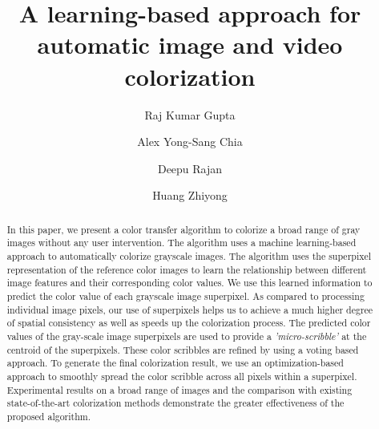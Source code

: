 \documentclass[twocolumn]{svjour3}          %
\begin{document}

\title{A learning-based approach for automatic image and video colorization}
\subtitle{}

\author{Raj Kumar Gupta \and Alex Yong-Sang Chia \and Deepu Rajan \and Huang Zhiyong}
\date{ }%

\maketitle


\begin{abstract}
In this paper, we present a color transfer algorithm to colorize a broad range of gray images without any user intervention. The algorithm uses a machine learning-based approach to automatically colorize grayscale images. The algorithm uses the superpixel representation of the reference color images to learn the relationship between different image features and their corresponding color values. We use this learned information to predict the color value of each grayscale image superpixel. As compared to processing individual image pixels, our use of superpixels helps us to achieve a much higher degree of spatial consistency as well as speeds up the colorization process. The predicted color values of the gray-scale image superpixels are used to provide a \emph{'micro-scribble'} at the centroid of the superpixels. These color scribbles are refined by using a voting based approach. To generate the final colorization result, we use an optimization-based approach to smoothly spread the color scribble across all pixels within a superpixel. Experimental results on a broad range of images and the comparison with existing state-of-the-art colorization methods demonstrate the greater effectiveness of the proposed algorithm.

\end{abstract}
\end{document}
